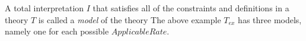 A total interpretation $I$ that satisfies all of the constraints and definitions in a theory $T$ is called a \emph{model} of the theory
The above example $T_{ex}$ has three models, namely one for each possible $ApplicableRate$.
\begin{comment}


\begin{align*}
& \{ApplicableRate = 7, RegistrationType = Modest\}\text{,}\\
& \{ApplicableRate = 10, RegistrationType = Other\}\text{ and }\\ 
& I_{ex}\text{.}
\end{align*}
\end{comment}
\begin{comment}


\end{comment}
